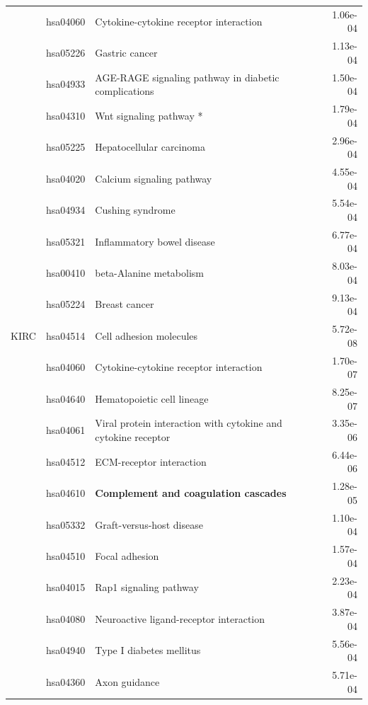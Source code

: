 \begin{longtable}{cllr}
 & hsa04060 & \textcolor{\clrnew}{Cytokine-cytokine receptor interaction} & 1.06e-04 \\ 
 & hsa05226 & \textcolor{\clrnew}{Gastric cancer} & 1.13e-04 \\ 
 & hsa04933 & \textcolor{\clrnew}{AGE-RAGE signaling pathway in diabetic complications} & 1.50e-04 \\ 
 & hsa04310 & \textcolor{\clrnew}{Wnt signaling pathway *} & 1.79e-04 \\ 
 & hsa05225 & \textcolor{\clrnew}{Hepatocellular carcinoma} & 2.96e-04 \\ 
 & hsa04020 & \textcolor{\clrnew}{Calcium signaling pathway} & 4.55e-04 \\ 
 & hsa04934 & \textcolor{\clrnew}{Cushing syndrome} & 5.54e-04 \\ 
 & hsa05321 & \textcolor{\clrnew}{Inflammatory bowel disease} & 6.77e-04 \\ 
 & hsa00410 & \textcolor{\clrnew}{beta-Alanine metabolism} & 8.03e-04 \\ 
 & hsa05224 & \textcolor{\clrnew}{Breast cancer} & 9.13e-04 \\ 
\midrule 
KIRC & hsa04514 & \textcolor{\clrnew}{Cell adhesion molecules} & 5.72e-08\\ 
 & hsa04060 & \textcolor{\clrnew}{Cytokine-cytokine receptor interaction} & 1.70e-07 \\ 
 & hsa04640 & \textcolor{\clrnew}{Hematopoietic cell lineage} & 8.25e-07 \\ 
 & hsa04061 & \textcolor{\clrnew}{Viral protein interaction with cytokine and cytokine receptor} & 3.35e-06 \\ 
 & hsa04512 & \textcolor{\clrnew}{ECM-receptor interaction} & 6.44e-06 \\ 
 \rowcolor{\clrpath}& hsa04610 & \textbf{Complement and coagulation cascades} & 1.28e-05 \\ 
 & hsa05332 & \textcolor{\clrnew}{Graft-versus-host disease} & 1.10e-04 \\ 
 & hsa04510 & \textcolor{\clrnew}{Focal adhesion} & 1.57e-04 \\ 
 & hsa04015 & \textcolor{\clrnew}{Rap1 signaling pathway} & 2.23e-04 \\ 
 & hsa04080 & \textcolor{\clrnew}{Neuroactive ligand-receptor interaction} & 3.87e-04 \\ 
 & hsa04940 & \textcolor{\clrnew}{Type I diabetes mellitus} & 5.56e-04 \\ 
 & hsa04360 & \textcolor{\clrnew}{Axon guidance} & 5.71e-04 \\ 

\end{longtable}
